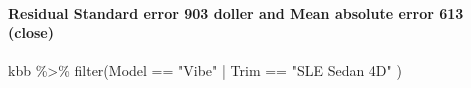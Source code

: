 \documentclass[
]{article}
\newenvironment{Shaded}{\begin{snugshade}}{\end{snugshade}}
\newcommand{\FunctionTok}[1]{\textcolor[rgb]{0.00,0.00,0.00}{#1}}
\newcommand{\NormalTok}[1]{#1}
\newcommand{\SpecialCharTok}[1]{\textcolor[rgb]{0.00,0.00,0.00}{#1}}
\newcommand{\StringTok}[1]{\textcolor[rgb]{0.31,0.60,0.02}{#1}}
\begin{document}
\hypertarget{residual-standard-error-903-doller-and-mean-absolute-error-613-close}{%
\paragraph{Residual Standard error 903 doller and Mean absolute error
613
(close)}\label{residual-standard-error-903-doller-and-mean-absolute-error-613-close}}

\begin{Shaded}
\begin{Highlighting}[]
\NormalTok{kbb }\SpecialCharTok{\%\textgreater{}\%} \FunctionTok{filter}\NormalTok{(Model }\SpecialCharTok{==} \StringTok{"Vibe"} \SpecialCharTok{|}\NormalTok{ Trim }\SpecialCharTok{==} \StringTok{"SLE Sedan 4D"}\NormalTok{ ) }
\end{Highlighting}
\end{Shaded}
\end{document}
